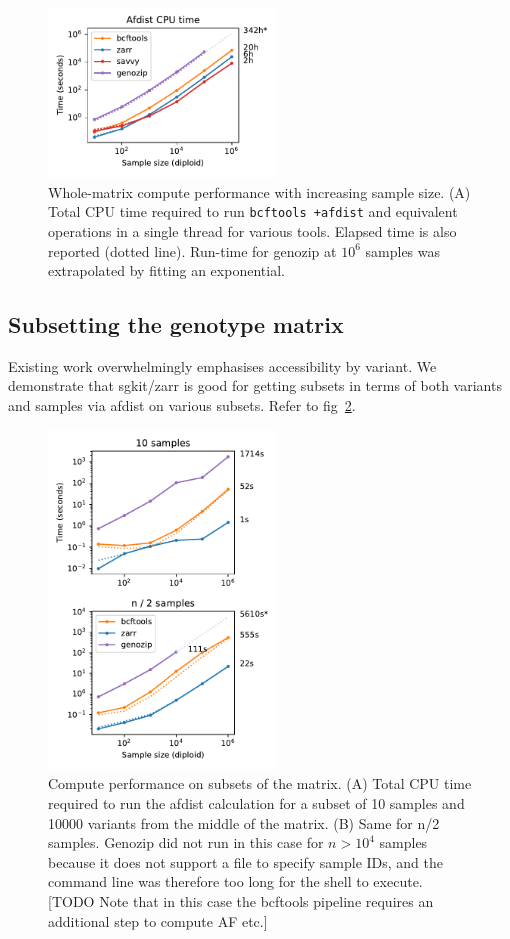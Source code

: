\documentclass[a4paper,num-refs]{oup-contemporary}
\begin{document}
\begin{figure}
\includegraphics[width=6cm]{figures/whole-matrix-compute}
\caption{Whole-matrix compute performance with increasing sample size.
(A) Total CPU time required to run \texttt{bcftools +afdist}
and equivalent operations in a single thread for various tools.
Elapsed time is also reported (dotted line). Run-time for genozip
at $10^6$ samples was extrapolated by fitting an exponential.
\label{fig-whole-matrix-compute}}
\end{figure}

\subsection{Subsetting the genotype matrix}
Existing work overwhelmingly emphasises accessibility by variant.
We demonstrate that sgkit/zarr is good for getting subsets
in terms of both variants and samples via afdist on various subsets.
Refer to fig~\ref{fig-subset-matrix-compute}.

\begin{figure}
\includegraphics[width=6cm]{figures/subset-matrix-compute}
\caption{Compute performance on subsets of the matrix.
(A) Total CPU time required to run the afdist calculation for
a subset of 10 samples and 10000 variants from the middle of the matrix.
(B) Same for n/2 samples. Genozip did not run in this case for
$n > 10^4$ samples because it does not support a file to specify
sample IDs, and the command line was therefore too long for the shell
to execute. [TODO Note that in this case the bcftools pipeline requires
an additional step to compute AF etc.]
\label{fig-subset-matrix-compute}}
\end{figure}
\end{document}
